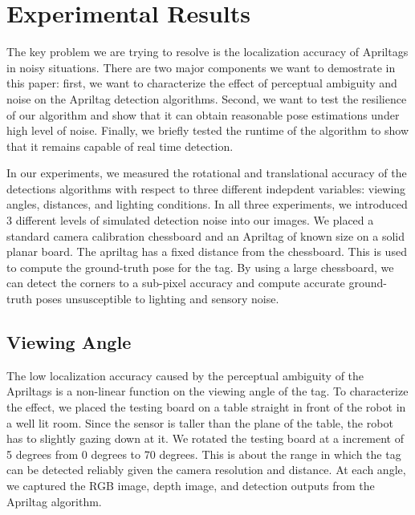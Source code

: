 \section{Experimental Results}
\label{sec:res}
The key problem we are trying to resolve is the localization accuracy of Apriltags in noisy situations. There are two major components we want to demostrate in this paper: first, we want to characterize the effect of perceptual ambiguity and noise on the Apriltag detection algorithms. Second, we want to test the resilience of our algorithm and show that it can obtain reasonable pose estimations under high level of noise. Finally, we briefly tested the runtime of the algorithm to show that it remains capable of real time detection. 

In our experiments, we measured the rotational and translational accuracy of the detections algorithms with respect to three different indepdent variables: viewing angles, distances, and lighting conditions. In all three experiments, we introduced 3 different levels of simulated detection noise into our images. We placed a standard camera calibration chessboard and an Apriltag of known size on a solid planar board. The apriltag has a fixed distance from the chessboard. This is used to compute the ground-truth pose for the tag. By using a large chessboard, we can detect the corners to a sub-pixel accuracy and compute accurate ground-truth poses unsusceptible to lighting and sensory noise.

\subsection{Viewing Angle}
The low localization accuracy caused by the perceptual ambiguity of the Apriltags is a non-linear function on the viewing angle of the tag. To characterize the effect, we placed the testing board on a table straight in front of the robot in a well lit room. Since the sensor is taller than the plane of the table, the robot has to slightly gazing down at it.  We rotated the testing board at a increment of 5 degrees from 0 degrees to 70 degrees. This is about the range in which the tag can be detected reliably given the camera resolution and distance. At each angle, we captured the RGB image, depth image, and detection outputs from the Apriltag algorithm. 

